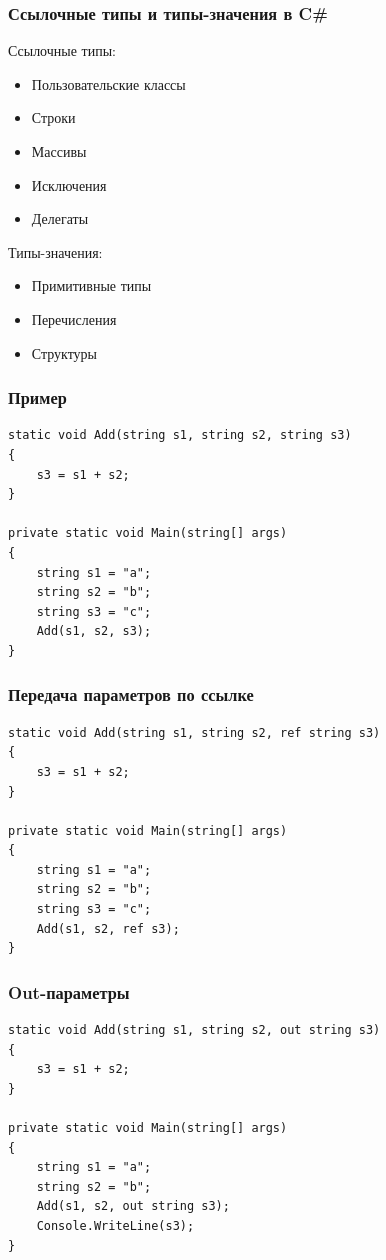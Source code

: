 \documentclass{../../slides-style}
\begin{document}
    \begin{frame}
        \frametitle{Ссылочные типы и типы-значения в C\#}
        Ссылочные типы:
        \begin{itemize}
            \item Пользовательские классы
            \item Строки
            \item Массивы
            \item Исключения
            \item Делегаты
        \end{itemize}

        Типы-значения:
        \begin{itemize}
            \item Примитивные типы
            \item Перечисления
            \item Структуры
        \end{itemize}
    \end{frame}
    
        \begin{frame}[fragile]
        \frametitle{Пример}
        \begin{verbatim}
static void Add(string s1, string s2, string s3)
{
    s3 = s1 + s2;
}

private static void Main(string[] args)
{
    string s1 = "a";
    string s2 = "b";
    string s3 = "c";
    Add(s1, s2, s3);
}
        \end{verbatim}
    \end{frame}

    \begin{frame}[fragile]
        \frametitle{Передача параметров по ссылке}
        \begin{verbatim}
static void Add(string s1, string s2, ref string s3)
{
    s3 = s1 + s2;
}

private static void Main(string[] args)
{
    string s1 = "a";
    string s2 = "b";
    string s3 = "c";
    Add(s1, s2, ref s3);
}
        \end{verbatim}
    \end{frame}

    \begin{frame}[fragile]
        \frametitle{Out-параметры}
        \begin{verbatim}
static void Add(string s1, string s2, out string s3)
{
    s3 = s1 + s2;
}

private static void Main(string[] args)
{
    string s1 = "a";
    string s2 = "b";
    Add(s1, s2, out string s3);
    Console.WriteLine(s3);
}
        \end{verbatim}
    \end{frame}
\end{document}
